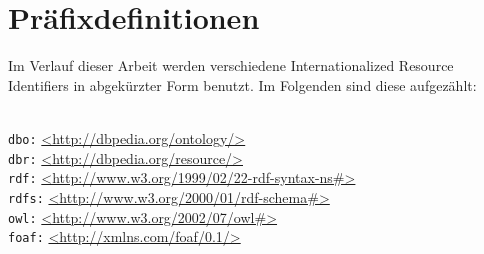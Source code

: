 \section{Präfixdefinitionen}
\label{präfix}

Im Verlauf dieser Arbeit werden verschiedene Internationalized Resource Identifiers in abgekürzter Form benutzt. 
Im Folgenden sind diese aufgezählt:
\begin{tabbing}
\hspace*{3cm}\=  \\ \kill
\verb|dbo:| \> \url{<http://dbpedia.org/ontology/>}\\
\verb|dbr:| \> \url{<http://dbpedia.org/resource/>}\\
\verb|rdf:| \> \url{<http://www.w3.org/1999/02/22-rdf-syntax-ns#>}\\
\verb|rdfs:| \> \url{<http://www.w3.org/2000/01/rdf-schema#>}\\
\verb|owl:| \> \url{<http://www.w3.org/2002/07/owl#>}\\
\verb|foaf:| \> \url{<http://xmlns.com/foaf/0.1/>}
\end{tabbing}
\newpage